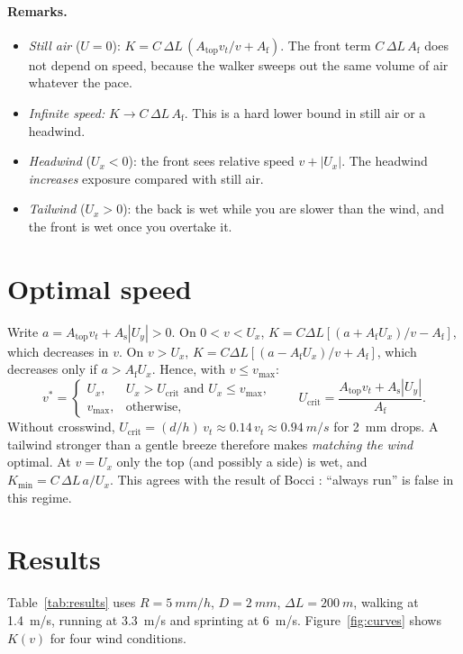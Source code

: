 \documentclass[11pt,a4paper]{article}
\newcommand{\Atop}{A_{\mathrm{top}}}
\newcommand{\Af}{A_{\mathrm{f}}}
\newcommand{\As}{A_{\mathrm{s}}}
\newcommand{\Ucrit}{U_{\mathrm{crit}}}
\begin{document}
\paragraph{Remarks.}
\begin{itemize}
\item \emph{Still air} ($U=0$): $K=C\,\Delta L\,(\Atop v_t/v+\Af)$. The front term $C\,\Delta L\,\Af$ does not depend on speed, because the walker sweeps out the same volume of air whatever the pace.
\item \emph{Infinite speed:} $K\to C\,\Delta L\,\Af$. This is a hard lower bound in still air or a headwind.
\item \emph{Headwind} ($U_x<0$): the front sees relative speed $v+|U_x|$. The headwind \emph{increases} exposure compared with still air.
\item \emph{Tailwind} ($U_x>0$): the back is wet while you are slower than the wind, and the front is wet once you overtake it.
\end{itemize}

\section{Optimal speed}\label{sec:opt}
Write $a=\Atop v_t+\As|U_y|>0$. On $0<v<U_x$, $K=C\Delta L[(a+\Af U_x)/v-\Af]$, which decreases in $v$. On $v>U_x$, $K=C\Delta L[(a-\Af U_x)/v+\Af]$, which decreases only if $a>\Af U_x$. Hence, with $v\le v_{\max}$:
\begin{equation}
v^\ast=\begin{cases}U_x, & U_x>\Ucrit \text{ and } U_x\le v_{\max},\\ v_{\max}, & \text{otherwise,}\end{cases}
\qquad
\Ucrit=\frac{\Atop v_t+\As|U_y|}{\Af}.
\end{equation}
Without crosswind, $\Ucrit=(d/h)\,v_t\approx 0.14\,v_t\approx\SI{0.94}{m/s}$ for \SI{2}{mm} drops. A tailwind stronger than a gentle breeze therefore makes \emph{matching the wind} optimal. At $v=U_x$ only the top (and possibly a side) is wet, and $K_{\min}=C\,\Delta L\,a/U_x$. This agrees with the result of Bocci \cite{bocci2012}: ``always run'' is false in this regime.

\section{Results}
Table~\ref{tab:results} uses $R=\SI{5}{mm/h}$, $D=\SI{2}{mm}$, $\Delta L=\SI{200}{m}$, walking at \SI{1.4}{m/s}, running at \SI{3.3}{m/s} and sprinting at \SI{6}{m/s}. Figure~\ref{fig:curves} shows $K(v)$ for four wind conditions.
\end{document}
